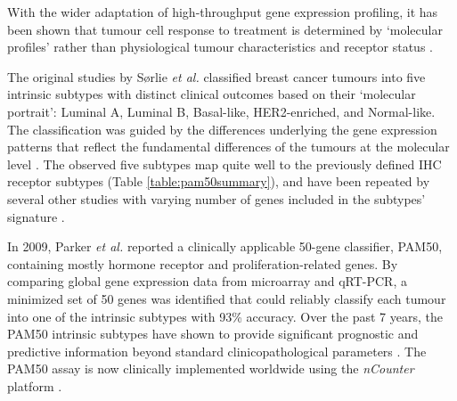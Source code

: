With the wider adaptation of high-throughput gene expression profiling, it has been shown that tumour cell response to treatment is determined by ‘molecular profiles’ rather than physiological tumour characteristics and receptor status \cite{Weigelt2010}. 

The original studies by Sørlie \textit{et al.} \cite{Srlie2001GeneImplications} classified breast cancer tumours into five intrinsic subtypes with distinct clinical outcomes based on their ‘molecular portrait’: Luminal A, Luminal B, Basal-like, HER2-enriched, and Normal-like. The classification was guided by the differences underlying the gene expression patterns that reflect the fundamental differences of the tumours at the molecular level \cite{Srlie2003RepeatedSets}. The observed five subtypes map quite well to the previously defined IHC receptor subtypes (Table  \ref{table:pam50summary}), and have been repeated by several other studies with varying number of genes included in the subtypes’ signature \cite{Dai2015}. 

In 2009, Parker \textit{et al. }\cite{ParkerSupervisedSubtypes} reported a clinically applicable 50-gene classifier, PAM50, containing mostly hormone receptor and proliferation-related genes. By comparing global gene expression data from microarray and qRT-PCR, a minimized set of 50 genes was identified that could reliably classify each tumour into one of the intrinsic subtypes with 93\% accuracy. Over the past 7 years, the PAM50 intrinsic subtypes have shown to provide significant prognostic and predictive information beyond standard clinicopathological parameters \cite{GnantPredictingAlone, Vidal2017}. The PAM50 assay is now clinically implemented worldwide using the \textit{nCounter} platform \cite{Vidal2017}.


